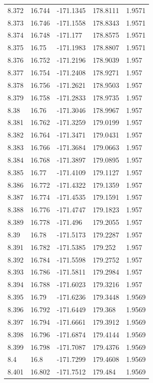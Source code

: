 \begin{tabular}{lllll}
8.372 & 16.744 & -171.1345 & 178.8111 & 1.9571 \\
8.373 & 16.746 & -171.1558 & 178.8343 & 1.9571 \\
8.374 & 16.748 & -171.177 & 178.8575 & 1.9571 \\
8.375 & 16.75 & -171.1983 & 178.8807 & 1.9571 \\
8.376 & 16.752 & -171.2196 & 178.9039 & 1.957 \\
8.377 & 16.754 & -171.2408 & 178.9271 & 1.957 \\
8.378 & 16.756 & -171.2621 & 178.9503 & 1.957 \\
8.379 & 16.758 & -171.2833 & 178.9735 & 1.957 \\
8.38 & 16.76 & -171.3046 & 178.9967 & 1.957 \\
8.381 & 16.762 & -171.3259 & 179.0199 & 1.957 \\
8.382 & 16.764 & -171.3471 & 179.0431 & 1.957 \\
8.383 & 16.766 & -171.3684 & 179.0663 & 1.957 \\
8.384 & 16.768 & -171.3897 & 179.0895 & 1.957 \\
8.385 & 16.77 & -171.4109 & 179.1127 & 1.957 \\
8.386 & 16.772 & -171.4322 & 179.1359 & 1.957 \\
8.387 & 16.774 & -171.4535 & 179.1591 & 1.957 \\
8.388 & 16.776 & -171.4747 & 179.1823 & 1.957 \\
8.389 & 16.778 & -171.496 & 179.2055 & 1.957 \\
8.39 & 16.78 & -171.5173 & 179.2287 & 1.957 \\
8.391 & 16.782 & -171.5385 & 179.252 & 1.957 \\
8.392 & 16.784 & -171.5598 & 179.2752 & 1.957 \\
8.393 & 16.786 & -171.5811 & 179.2984 & 1.957 \\
8.394 & 16.788 & -171.6023 & 179.3216 & 1.957 \\
8.395 & 16.79 & -171.6236 & 179.3448 & 1.9569 \\
8.396 & 16.792 & -171.6449 & 179.368 & 1.9569 \\
8.397 & 16.794 & -171.6661 & 179.3912 & 1.9569 \\
8.398 & 16.796 & -171.6874 & 179.4144 & 1.9569 \\
8.399 & 16.798 & -171.7087 & 179.4376 & 1.9569 \\
8.4 & 16.8 & -171.7299 & 179.4608 & 1.9569 \\
8.401 & 16.802 & -171.7512 & 179.484 & 1.9569 \\

\end{tabular}
